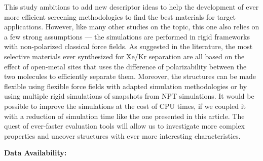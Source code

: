 \documentclass[main]{subfiles}
\begin{document}
This study ambitions to add new descriptor ideas to help the development of ever more efficient screening methodologies to find the best materials for target applications. However, like many other studies on the topic, this one also relies on a few strong assumptions --- the simulations are performed in rigid frameworks with non-polarized classical force fields. As suggested in the literature, the most selective materials ever synthesized for Xe/Kr separation are all based on the effect of open-metal sites that uses the difference of polarizability between the two molecules to efficiently separate them.\autocite{Li_2019, Pei_2022} Moreover, the structures can be made flexible using flexible force fields with adapted simulation methodologies\autocite{Bousquet2012} or by using multiple rigid simulations of snapshots from NPT simulations\autocite{Witman_2017}.
It would be possible to improve the simulations at the cost of CPU times, if we coupled it with a reduction of simulation time like the one presented in this article. The quest of ever-faster evaluation tools will allow us to investigate more complex properties and uncover structures with ever more interesting characteristics.

\textbf{Data Availability:} \url{}

\OnlyInSubfile{\printglobalbibliography}
\end{document}
